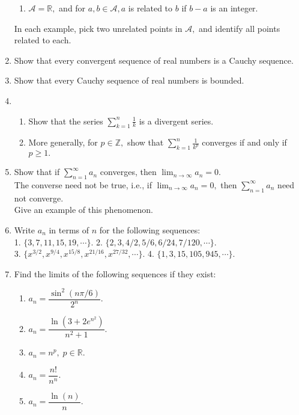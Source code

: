 \begin{enumerate}[label=(\arabic*)]
\begin{enumerate}[nosep]
		\item $\mathcal{A} = \mathbb{R},$ and for $a, b \in \mathcal{A}, a$ is related to $b$ if $b - a$ is an integer.
	\end{enumerate}
	In each example, pick two unrelated points in $\mathcal{A},$ and identify all points related to each.
	\item Show that every convergent sequence of real numbers is a Cauchy sequence.
	\item Show that every Cauchy sequence of real numbers is bounded.
	\item 
	\begin{enumerate}[nosep] 
		\item Show that the series $\displaystyle\sum_{k=1}^{n}\frac{1}{k}$ is a divergent series.
		\item More generally, for $p \in \mathbb{Z},$ show that $\displaystyle\sum_{k=1}^{n}\frac{1}{k^p}$ converges if and only if $p \ge 1.$
	\end{enumerate}
	\item Show that if $\displaystyle\sum_{n=1}^{\infty}a_n$ converges, then $\displaystyle\lim_{n\to \infty}a_n = 0.$\\
	The converse need not be true, i.e., if $\displaystyle\lim_{n\to \infty}a_n = 0,$ then $\displaystyle\sum_{n=1}^{\infty}a_n$ need not converge.\\
	Give an example of this phenomenon.
	\item Write $a_n$ in terms of $n$ for the following sequences:\\
	1. $\{3, 7, 11, 15, 19, \cdots\}.$ \hfill 2. $\{2, 3, 4/2, 5/6, 6/24, 7/120, \cdots\}.$\\
	3. $\{x^{3/2}, x^{9/4}, x^{15/8}, x^{21/16}, x^{27/32}, \cdots\}.$ \hfill 4. $\{1, 3, 15, 105, 945, \cdots\}.$
	\newpage
	\item Find the limits of the following sequences if they exist:\\
	\begin{multicols}{2}
		\begin{enumerate} [label = \arabic*.]
			\item $a_n = \dfrac{\sin^2(n\pi/6)}{2^n}$.
			\item $a_n = \dfrac{\ln(3 + 2e^{n^2})}{n^2 + 1}.$\\
			\item $a_n = n^p,\;p\in\mathbb{R}.$
			\item $a_n = \dfrac{n!}{n^n}.$\\
			\item $a_n = \dfrac{\ln(n)}{n}.$

\end{enumerate}
\end{multicols}
\end{enumerate}
